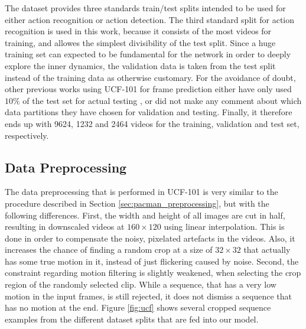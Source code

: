 The dataset provides three standards train/test splits intended to be used for either action recognition or action detection. The third standard split for action recognition is used in this work, because it consists of the most videos for training, and allowes the simplest divisibility of the test split. Since a huge training set can expected to be fundamental for the network in order to deeply explore the inner dynamics, the validation data is taken from the test split instead of the training data as otherwise customary. For the avoidance of doubt, other previous works using UCF-101 for frame prediction either have only used $ 10\% $ of the test set for actual testing \parencite[p. 12]{deep_multiscale_video_pred}, or did not make any comment about which data partitions they have chosen for validation and testing. Finally, it therefore ends up with \num{9624}, \num{1232} and \num{2464} videos for the training, validation and test set, respectively.


\subsection{Data Preprocessing}

The data preprocessing that is performed in UCF-101 is very similar to the procedure described in Section \ref{sec:pacman_preprocessing}, but with the following differences. First, the width and height of all images are cut in half, resulting in downscaled videos at $160 \times 120$ using linear interpolation. This is done in order to compensate the noisy, pixelated artefacts in the videos. Also, it increases the chance of finding a random crop at a size of $ 32 \times 32 $ that actually has some true motion in it, instead of just flickering caused by noise. Second, the constraint regarding motion filtering is slightly weakened, when selecting the crop region of the randomly selected clip. While a sequence, that has a very low motion in the input frames, is still rejected, it does not dismiss a sequence that has no motion at the end. Figure \ref{fig:ucf} shows several cropped sequence examples from the different dataset splits that are fed into our model.


